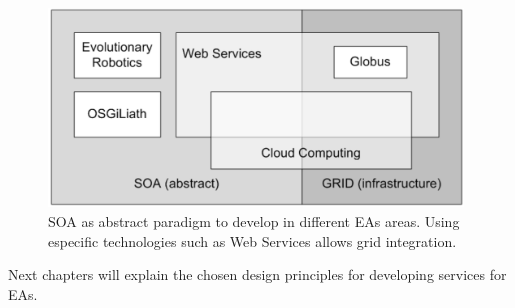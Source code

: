\begin{figure}
\centering
\includegraphics[width=26pc]{gfx/soa/soagrid.jpg}
\caption{SOA as abstract paradigm to develop in different EAs areas. Using especific technologies such as Web Services allows grid integration.}
\label{fig:soagrid}
\end{figure}

Next chapters will explain the chosen design principles for developing services for EAs.